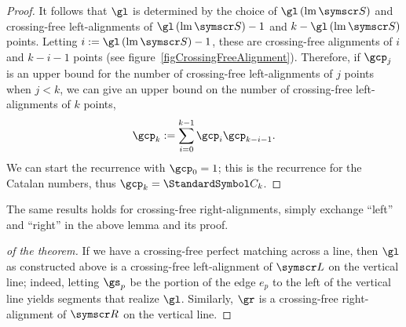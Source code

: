 \begin{lemma}
\begin{proof}
It follows that $\gl$ is determined by the choice of $\gl\of {\leftmost\pointset S}$
and crossing-free left-align\-ments
of $\gl\of{\leftmost\pointset S}-1$ and $k-\gl\of{\leftmost\pointset S}$ points.
Letting $i\DefineAs \gl\of {\leftmost\pointset S} - 1$, these are crossing-free alignments of $i$ and $k-i-1$ points (see
figure~\ref{figCrossingFreeAlignment}).
Therefore, if $\gcp_j$ is an upper bound for the number of crossing-free
left-alignments of $j$ points when $j < k$,
we can give an upper bound on the number of crossing-free left-alignments of $k$ points,
\[\gcp_k\DefineAs\sum{i=0}[k-1]\gcp_{i}\gcp_{k-i-1}\text.\]
We can start the recurrence with $\gcp_0 = 1$; this is the recurrence for the Catalan numbers, thus
$\gcp_k=\CatalanNumber k$.
\end{proof}
\end{lemma}
The same results holds for crossing-free right-alignments, simply exchange ``left'' and ``right'' in the above
lemma and its proof.

\begin{proof}[of the theorem]
If we have a crossing-free perfect matching across a line, then $\gl$ as constructed above is a crossing-free
left-alignment of $\pointset L$ on the vertical line; indeed, letting $\gs_p$ be the portion of the edge $e_p$
to the left of the vertical line yields segments that realize $\gl$.
Similarly, $\gr$ is a crossing-free right-alignment of $\pointset R$ on the vertical line.
\end{proof}

